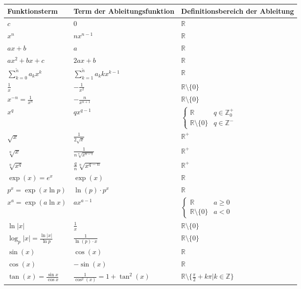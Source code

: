 \documentclass[fontsize=9pt,
               parskip=half-,
               DIV=14,
               listof=chapterentry,
               tocflat]{scrbook}
\begin{document}
\begin{longtabu} to \linewidth {X[l]X[l]X[l]} \\ \toprule 
Funktionsterm & Term der Ableitungsfunktion & Definitionsbereich der Ableitung \\ 
\midrule
$c$ & $0$ & $\mathbb {R} $ \\ 
$x^{n}$ & $nx^{n-1}$ & $\mathbb {R} $ \\ 
$ax+b$ & $a$ & $\mathbb {R} $ \\ 
$ax^{2}+bx+c$ & $2ax+b$ & $\mathbb {R} $ \\ 
$\sum _{k=0}^{\tilde {n}}a_{k}x^{k}$ & $\sum _{k=1}^{\tilde {n}}a_{k}kx^{k-1}$ & $\mathbb {R} $ \\ 
${\frac {1}{x}}$ & $-{\frac {1}{x^{2}}}$ & $\mathbb {R} \setminus \{0\}$ \\ 
$x^{-n}={\frac {1}{x^{n}}}$ & $-{\frac {n}{x^{n+1}}}$ & $\mathbb {R} \setminus \{0\}$ \\ 
$x^{q}$ & $qx^{q-1}$ & ${\begin{cases}\mathbb {R} &q\in \mathbb {Z} _{0}^{+}\\\mathbb {R} \setminus \{0\}&q\in \mathbb {Z} ^{-}\end{cases}}$ \\ 
${\sqrt {x}}$ & ${\frac {1}{2{\sqrt {x}}}}$ & $\mathbb {R} ^{+}$ \\ 
${\sqrt[{n}]{x}}$ & ${\frac {1}{n{\sqrt[{n}]{x^{n-1}}}}}$ & $\mathbb {R} ^{+}$ \\ 
${\sqrt[{n}]{x^{q}}}$ & ${\frac {q}{n}}{\sqrt[{n}]{x^{q-n}}}$ & $\mathbb {R} ^{+}$ \\ 
$\exp(x)=e^{x}$ & $\exp(x)$ & $\mathbb {R} $ \\ 
$p^{x}=\exp(x\ln p)$ & $\ln(p)\cdot p^{x}$ & $\mathbb {R} $ \\ 
$x^{a}=\exp(a\ln x)$ & $ax^{a-1}$ & ${\begin{cases}\mathbb {R} &a\geq 0\\\mathbb {R} \setminus \{0\}&a<0\end{cases}}$ \\ 
$\ln |x|$ & ${\frac {1}{x}}$ & $\mathbb {R} \setminus \{0\}$ \\ 
$\log _{p}|x|={\frac {\ln |x|}{\ln p}}$ & ${\frac {1}{\ln(p)\cdot x}}$ & $\mathbb {R} \setminus \{0\}$ \\ 
$\sin(x)$ & $\cos(x)$ & $\mathbb {R} $ \\ 
$\cos(x)$ & $-\sin(x)$ & $\mathbb {R} $ \\ 
$\tan(x)={\frac {\sin x}{\cos x}}$ & ${\frac {1}{\cos ^{2}(x)}}=1+\tan ^{2}(x)$ & $\mathbb {R} \setminus \{{\frac {\pi }{2}}+k\pi |k\in \mathbb {Z} \}$ \\ 

\end{longtabu}
\end{document}
